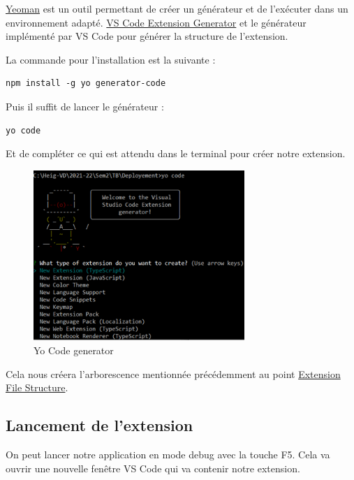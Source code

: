 \documentclass[
    iict, %
    il, %
]{heig-tb}
\begin{document}
\href{https://yeoman.io/}{Yeoman} est un outil permettant de créer un générateur et de l'exécuter dans un environnement adapté.
\href{https://www.npmjs.com/package/generator-code}{VS Code Extension Generator} et le générateur implémenté par VS Code pour générer la structure de l'extension.

La commande pour l'installation est la suivante :

\begin{lstlisting}[frame=single,caption={generator-code},label={generator-code}]
npm install -g yo generator-code
\end{lstlisting}

Puis il suffit de lancer le générateur :

\begin{lstlisting}[frame=single]
yo code
\end{lstlisting}

Et de compléter ce qui est attendu dans le terminal pour créer notre extension.

\begin{figure}[!h]
    \begin{center}
        \includegraphics[width=8cm]{assets/figures/yo-code.png}
    \end{center}
    \caption[Yo Code generator]{\label{yo-code}Yo Code generator}
\end{figure}

Cela nous créera l'arborescence mentionnée précédemment au point \hyperref[Extension File Structure]{Extension File Structure}.

\subsection{Lancement de l'extension}
On peut lancer notre application en mode debug avec la touche F5. Cela va ouvrir une nouvelle fenêtre VS Code qui va contenir notre extension.
\end{document}
